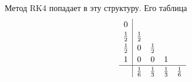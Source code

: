 \documentclass[a4paper,12pt]{article}
\begin{document}
	 Метод RK4 попадает в эту структуру. Его таблица
	 \[
	 \renewcommand\arraystretch{1.2}
	 \begin{array}
	 	{c|cccc}
	 	0\\
	 	\frac{1}{2} & \frac{1}{2}\\
	 	\frac{1}{2} &0 &\frac{1}{2} \\
	 	1& 0& 0& 1\\
	 	\hline
	 	& \frac{1}{6} &\frac{1}{3} &\frac{1}{3} &\frac{1}{6} 
	 \end{array}
	 \]
\end{document}
